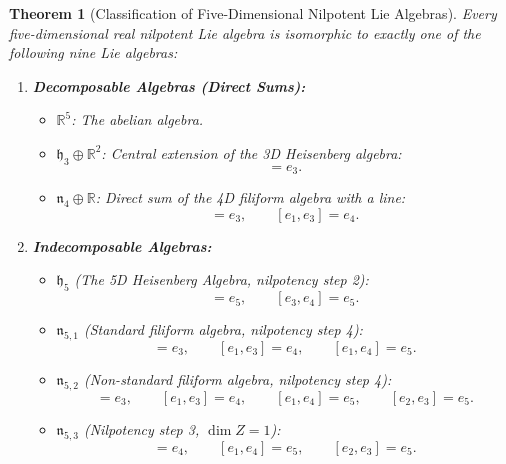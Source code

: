 \documentclass[11pt,a4paper]{article}
\newtheorem{theorem}{Theorem}[section]
\theoremstyle{definition}
\theoremstyle{remark}
\newcommand{\R}{\mathbb{R}}
\newcommand{\hh}{\mathfrak{h}}
\begin{document}
\begin{theorem}[Classification of Five-Dimensional Nilpotent Lie Algebras]\label{thm:nilp5}
Every five-dimensional real nilpotent Lie algebra is isomorphic to exactly one of the following nine Lie algebras:
\begin{enumerate}
    \item \textbf{Decomposable Algebras (Direct Sums):}
    \begin{itemize}
        \item $\R^5$: The abelian algebra.
        \item $\hh_3 \oplus \R^2$: Central extension of the 3D Heisenberg algebra:
        \begin{equation}
            [e_1, e_2] = e_3.
        \end{equation}
        \item $\mathfrak{n}_4 \oplus \R$: Direct sum of the 4D filiform algebra with a line:
        \begin{equation}
            [e_1, e_2] = e_3, \qquad [e_1, e_3] = e_4.
        \end{equation}
    \end{itemize}
    \item \textbf{Indecomposable Algebras:}
    \begin{itemize}
        \item $\hh_5$ (The 5D Heisenberg Algebra, nilpotency step 2):
        \begin{equation}
            [e_1, e_2] = e_5, \qquad [e_3, e_4] = e_5.
        \end{equation}
        \item $\mathfrak{n}_{5,1}$ (Standard filiform algebra, nilpotency step 4):
        \begin{equation}
            [e_1, e_2] = e_3, \qquad [e_1, e_3] = e_4, \qquad [e_1, e_4] = e_5.
        \end{equation}
        \item $\mathfrak{n}_{5,2}$ (Non-standard filiform algebra, nilpotency step 4):
        \begin{equation}
            [e_1, e_2] = e_3, \qquad [e_1, e_3] = e_4, \qquad [e_1, e_4] = e_5, \qquad [e_2, e_3] = e_5.
        \end{equation}
        \item $\mathfrak{n}_{5,3}$ (Nilpotency step 3, $\dim Z = 1$):
        \begin{equation}
            [e_1, e_2] = e_4, \qquad [e_1, e_4] = e_5, \qquad [e_2, e_3] = e_5.
        \end{equation}

\end{itemize}
\end{enumerate}
\end{theorem}
\end{document}
